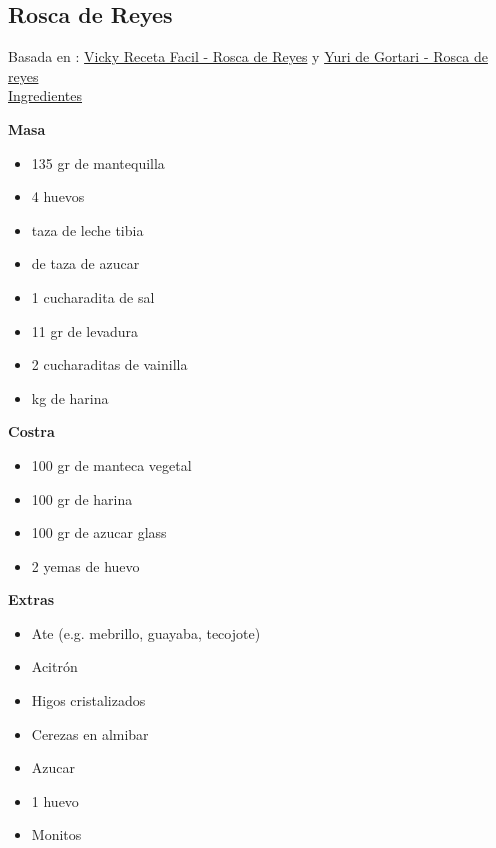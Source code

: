 \subsection{Rosca de Reyes}

Basada en : \href{https://www.youtube.com/watch?v=4IgNDiX7cHg}{Vicky Receta Facil - Rosca de Reyes} y \href{https://www.youtube.com/watch?v=zVnEPQhfi-s}{Yuri de Gortari - Rosca de reyes}\\

\underline{Ingredientes}

\textbf{Masa}
\begin{itemize}
\item 135 gr de mantequilla
\item 4 huevos
\item {} taza de leche tibia
\item {} de taza de azucar
\item 1 cucharadita de sal
\item 11 gr de levadura
\item 2 cucharaditas de vainilla
\item {} kg de harina
\end{itemize}

\textbf{Costra}
\begin{itemize}
\item 100 gr de manteca vegetal
\item 100 gr de harina
\item 100 gr de azucar glass
\item 2 yemas de huevo
\end{itemize}

\textbf{Extras}
\begin{itemize}
\item Ate (e.g. mebrillo, guayaba, tecojote)
\item Acitrón
\item Higos cristalizados
\item Cerezas en almibar
\item Azucar
\item 1 huevo
\item Monitos
\end{itemize}

